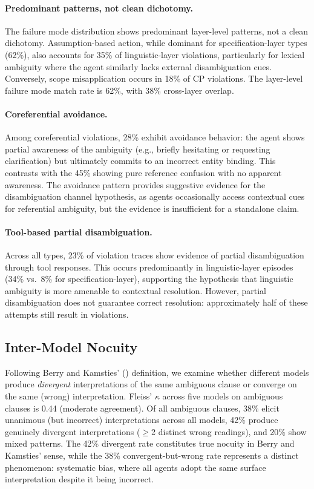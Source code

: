 \documentclass[11pt]{article}
\begin{document}
\paragraph{Predominant patterns, not clean dichotomy.}
The failure mode distribution shows predominant layer-level patterns, not a clean dichotomy. Assumption-based action, while dominant for specification-layer types (62\%), also accounts for 35\% of linguistic-layer violations, particularly for lexical ambiguity where the agent similarly lacks external disambiguation cues. Conversely, scope misapplication occurs in 18\% of CP violations. The layer-level failure mode match rate is 62\%, with 38\% cross-layer overlap.

\paragraph{Coreferential avoidance.}
Among coreferential violations, 28\% exhibit avoidance behavior: the agent shows partial awareness of the ambiguity (e.g., briefly hesitating or requesting clarification) but ultimately commits to an incorrect entity binding. This contrasts with the 45\% showing pure reference confusion with no apparent awareness. The avoidance pattern provides suggestive evidence for the disambiguation channel hypothesis, as agents occasionally access contextual cues for referential ambiguity, but the evidence is insufficient for a standalone claim.

\paragraph{Tool-based partial disambiguation.}
Across all types, 23\% of violation traces show evidence of partial disambiguation through tool responses. This occurs predominantly in linguistic-layer episodes (34\% vs.\ 8\% for specification-layer), supporting the hypothesis that linguistic ambiguity is more amenable to contextual resolution. However, partial disambiguation does not guarantee correct resolution: approximately half of these attempts still result in violations.

\subsection{Inter-Model Nocuity}
\label{sec:nocuity}

Following Berry and Kamsties' (\citeyear{berry2003ambiguity}) definition, we examine whether different models produce \emph{divergent} interpretations of the same ambiguous clause or converge on the same (wrong) interpretation. Fleiss' $\kappa$ across five models on ambiguous clauses is 0.44 (moderate agreement). Of all ambiguous clauses, 38\% elicit unanimous (but incorrect) interpretations across all models, 42\% produce genuinely divergent interpretations ($\geq$2 distinct wrong readings), and 20\% show mixed patterns. The 42\% divergent rate constitutes true nocuity in Berry and Kamsties' sense, while the 38\% convergent-but-wrong rate represents a distinct phenomenon: systematic bias, where all agents adopt the same surface interpretation despite it being incorrect.
\end{document}
